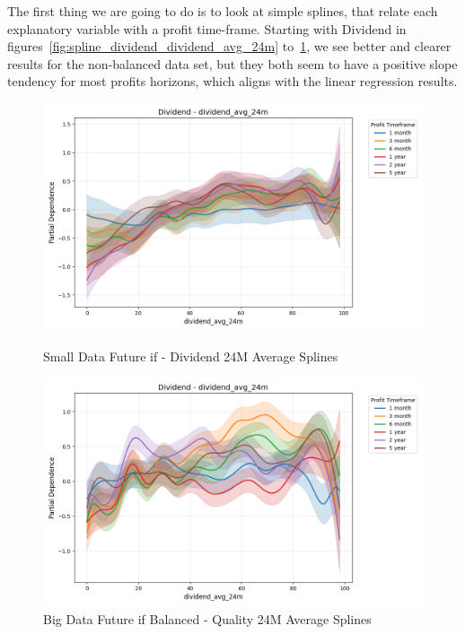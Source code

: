 \documentclass[11pt,english,a4paper,hidelinks]{book}
\begin{document}
\noindent The first thing we are going to do is to look at simple splines, that relate each explanatory variable with a profit time-frame. Starting with Dividend in figures~\ref{fig:spline_dividend_dividend_avg_24m} to~\ref{fig:spline_dividend_dividend_avg_24m_balanced}, we see better and clearer results for the non-balanced data set, but they both seem to have a positive slope tendency for most profits horizons, which aligns with the linear regression results. 

\begin{figure}[H]
    \centering
    \begin{minipage}{0.48\textwidth}
        \centering
        \includegraphics[width=\textwidth]{images/code/models/general_regression/splines/2D/Small Data future - IF/dividend_dividend_avg_24m.png}
        \caption{Small Data Future \acrshort{if} - Dividend 24M Average Splines}
        \label{fig:spline_dividend_dividend_avg_24m}
    \end{minipage}\hfill
    \begin{minipage}{0.48\textwidth}
        \centering
        \includegraphics[width=\textwidth]{images/code/models/general_regression/splines/2D/Big Data future - IF HARD Balanced/dividend_dividend_avg_24m.png}
        \caption{Big Data Future \acrshort{if} Balanced - Quality 24M Average Splines}
        \label{fig:spline_dividend_dividend_avg_24m_balanced}
    \end{minipage}
\end{figure}
\end{document}
